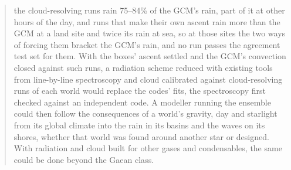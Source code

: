 \begin{abstract}
the cloud-resolving runs rain 75--84\% of the GCM's rain, part of it at other hours of the day, and runs that make
their own ascent rain more than the GCM at a land site and twice its rain at sea, so at those sites the two ways of
forcing them bracket the GCM's rain, and no run passes the agreement test set for
them. With the boxes' ascent settled and the GCM's convection closed against such runs, a
radiation scheme reduced with existing tools from line-by-line spectroscopy and cloud calibrated against
cloud-resolving runs of each world would replace the codes' fits, the spectroscopy first checked against an
independent code. A modeller running the ensemble could then follow the consequences of a world's gravity, day and starlight from its global climate into
the rain in its basins and the waves on its shores, whether that world was found around another star or designed.
With radiation and cloud built for other gases and condensables, the same could be done beyond the Gaean class.
\end{abstract}
